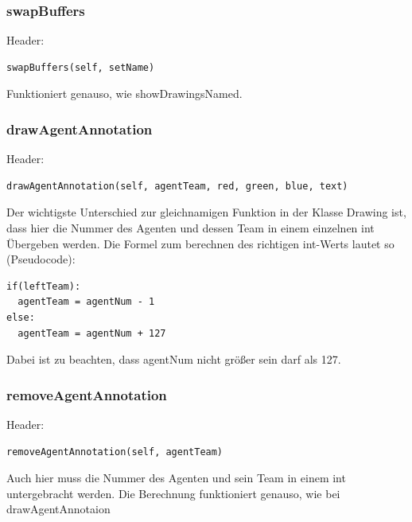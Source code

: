 \subsubsection{swapBuffers}
Header:

\begin{verbatim}swapBuffers(self, setName)
\end{verbatim}
Funktioniert genauso, wie showDrawingsNamed.

\subsubsection{drawAgentAnnotation}
Header:

\begin{verbatim}drawAgentAnnotation(self, agentTeam, red, green, blue, text)
\end{verbatim}
Der wichtigste Unterschied zur gleichnamigen Funktion in der Klasse 
Drawing ist, dass hier die Nummer des Agenten und dessen Team in einem 
einzelnen int Übergeben werden. Die Formel zum berechnen des richtigen 
int-Werts lautet so (Pseudocode):

\begin{verbatim}if(leftTeam):
  agentTeam = agentNum - 1
else:
  agentTeam = agentNum + 127
\end{verbatim}
Dabei ist zu beachten, dass agentNum nicht größer sein darf als 127.       

\subsubsection{removeAgentAnnotation}
Header:

\begin{verbatim}removeAgentAnnotation(self, agentTeam)
\end{verbatim}
Auch hier muss die Nummer des Agenten und sein Team in einem int 
untergebracht werden. Die Berechnung funktioniert genauso, wie bei drawAgentAnnotaion

